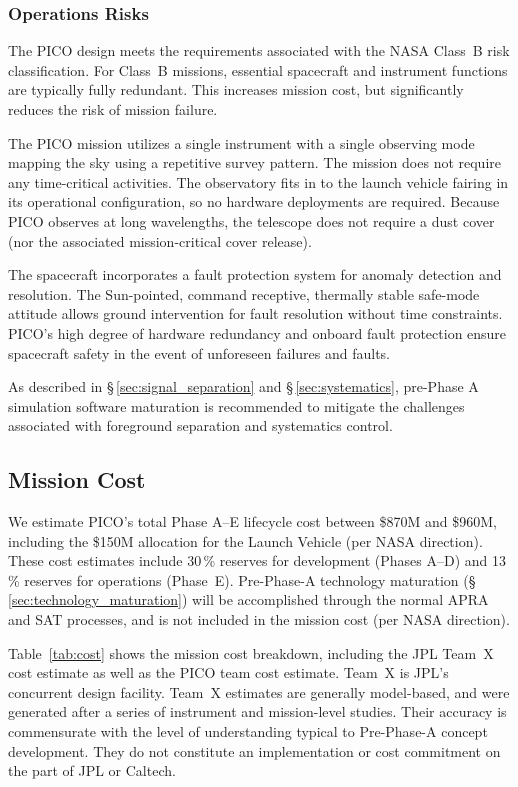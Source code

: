 \subsubsection{Operations Risks}
\label{sec:operations_risks} %

The PICO design meets the requirements associated with the NASA
Class~B risk classification. For Class~B missions, essential
spacecraft and instrument functions are typically fully
redundant. This increases mission cost, but significantly reduces the
risk of mission failure.

The PICO mission utilizes a single instrument with a single observing
mode mapping the sky using a repetitive survey pattern. The mission
does not require any time-critical activities. The observatory fits in
to the launch vehicle fairing in its operational configuration, so no
hardware deployments are required. Because PICO observes at long
wavelengths, the telescope does not require a dust cover (nor the
associated mission-critical cover release).

The spacecraft incorporates a fault protection system for anomaly
detection and resolution. The Sun-pointed, command receptive,
thermally stable safe-mode attitude allows ground intervention for
fault resolution without time constraints. PICO's high degree of
hardware redundancy and onboard fault protection ensure spacecraft
safety in the event of unforeseen failures and faults.

As described in \S\,\ref{sec:signal_separation} and
\S\,\ref{sec:systematics}, pre-Phase A simulation software maturation
is recommended to mitigate the challenges associated with foreground
separation and systematics control.

\subsection{Mission Cost}
\label{sec:mission_cost} %
%

%
We estimate PICO's total Phase A--E lifecycle cost between \$870M and
\$960M, including the \$150M allocation for the Launch Vehicle (per
NASA direction). These cost estimates include 30\,\% reserves for
development (Phases A--D) and 13\,\% reserves for operations
(Phase~E). Pre-Phase-A technology maturation
(\S\,\ref{sec:technology_maturation}) will be accomplished through the
normal APRA and SAT processes, and is not included in the mission cost
(per NASA direction).

Table~\ref{tab:cost} shows the mission cost breakdown, including the
JPL Team~X cost estimate as well as the PICO team cost estimate. Team~X
 is JPL's concurrent design facility. Team~X estimates are generally
model-based, and were generated after a series of instrument and
mission-level studies. Their accuracy is commensurate with the level
of understanding typical to Pre-Phase-A concept development. They do
not constitute an implementation or cost commitment on the part of JPL
or Caltech.


